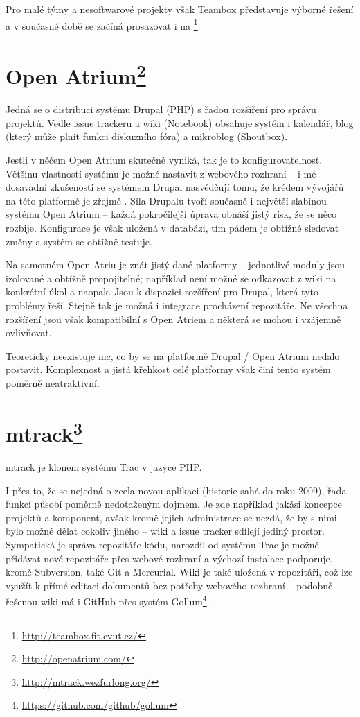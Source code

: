 \documentclass[thesis=B,czech]{FITthesis}[2012/05/02]
\begin{document}
Pro malé týmy a nesoftwarové projekty však Teambox představuje výborné řešení a v
současné době se začíná prosazovat i na \footnote{\url{http://teambox.fit.cvut.cz/}}.

\section[Open Atrium]{Open Atrium\footnote{\url{http://openatrium.com/}}}

Jedná se o distribuci systému Drupal (PHP) s řadou rozšíření pro správu
projektů. Vedle issue trackeru a wiki (Notebook) obsahuje systém i
kalendář, blog (který může plnit funkci diskuzního fóra) a
\gls{mikroblog} (Shoutbox).

Jestli v něčem Open Atrium skutečně vyniká, tak je to
konfigurovatelnost. Většinu vlastností systému je možné nastavit
z webového rozhraní -- i mé dosavadní zkušenosti se systémem Drupal
nasvědčují tomu, že krédem vývojářů na této platformě je zřejmě
. Síla Drupalu tvoří současně i největší
slabinou systému Open Atrium -- každá pokročilejší úprava obnáší jistý
risk, že se něco rozbije. Konfigurace je však uložená v databázi, tím
pádem je obtížné sledovat změny a systém se obtížně testuje.

Na samotném Open Atriu je znát jistý  dané platformy --
jednotlivé moduly jsou izolované a obtížně propojitelné; například není
možné se odkazovat z wiki na konkrétní úkol a naopak. Jsou k dispozici
rozšíření pro Drupal, která tyto problémy řeší. Stejně tak je možná i
integrace procházení repozitáře. Ne všechna rozšíření jsou však
kompatibilní s Open Atriem a některá se mohou i vzájemně
ovlivňovat.

Teoreticky neexistuje nic, co by se na platformě Drupal / Open Atrium nedalo
postavit. Komplexnost a jistá křehkost celé platformy však činí tento
systém poměrně neatraktivní.

\section[mtrack]{mtrack\footnote{\url{http://mtrack.wezfurlong.org/}}}

mtrack je klonem systému Trac v jazyce PHP.

I přes to, že se nejedná o zcela novou aplikaci (historie sahá do roku
2009), řada funkcí působí poměrně nedotaženým dojmem. Je zde například
jakási koncepce projektů a komponent, avšak kromě jejich administrace se
nezdá, že by s nimi bylo možné dělat cokoliv jiného -- wiki a issue
tracker sdílejí jediný prostor. Sympatická je správa repozitáře kódu,
narozdíl od systému Trac je možné přidávat nové repozitáře přes webové
rozhraní a výchozí instalace podporuje, kromě Subversion, také Git a
Mercurial. Wiki je také uložená v repozitáři, což lze využít k přímé
editaci dokumentů bez potřeby webového rozhraní -- podobně řešenou wiki
má i GitHub přes systém Gollum\footnote{\url{https://github.com/github/gollum}}.
\end{document}

